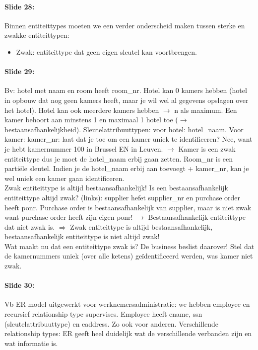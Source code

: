 \documentclass[10pt,a4paper]{report}
\begin{document}
\paragraph{Slide 28:}Binnen entiteittypes moeten we een verder onderscheid maken tussen sterke en zwakke entiteittypen:
\begin{itemize}
\item Zwak: entiteittype dat geen eigen sleutel kan voortbrengen. 
\end{itemize}

\paragraph{Slide 29:}Bv: hotel met naam en room heeft room\_nr. Hotel kan 0 kamers hebben (hotel in opbouw dat nog geen kamers heeft, maar je wil wel al gegevens opslagen over het hotel). Hotel kan ook meerdere kamers hebben $\rightarrow$ n als maximum. Een kamer behoort aan minstens 1 en maximaal 1 hotel toe ($\rightarrow$ bestaansafhankelijkheid). Sleutelattribuuttypen: voor hotel: hotel\_naam. Voor kamer: kamer\_nr: laat dat je toe om een kamer uniek te identificeren? Nee, want je hebt kamernummer 100 in Brussel EN in Leuven. $\rightarrow$ Kamer is een zwak entiteittype dus je moet de hotel\_naam erbij gaan zetten. Room\_nr is een partiële sleutel. Indien je de hotel\_naam erbij aan toevoegt + kamer\_nr, kan je wel uniek een kamer gaan identificeren.\\
Zwak entiteittype is altijd bestaansafhankelijk! Is een bestaansafhankelijk entiteittype altijd zwak? (links): supplier hefet supplier\_nr en purchase order heeft ponr. Purchase order is bestaansafhankelijk van supplier, maar is niet zwak want purchase order heeft zijn eigen ponr! $\rightarrow$ Bestaansafhankelijk entiteittype dat niet zwak is.
$\Rightarrow$ Zwak entiteittype is altijd bestaansafhankelijk, bestaansafhankelijk entiteittype is niet altijd zwak!\\
Wat maakt nu dat een entiteittype zwak is? De business beslist daarover! Stel dat de kamernummers uniek (over alle ketens) geïdentificeerd werden, was kamer niet zwak.

\paragraph{Slide 30:}Vb ER-model uitgewerkt voor werknemersadministratie: we hebben employee en recursief relationship type supervises. Employee heeft ename, ssn (sleutelattribuuttype) en eaddress. Zo ook voor anderen. Verschillende relationship types: ER geeft heel duidelijk wat de verschillende verbanden zijn en wat informatie is.
\end{document}
